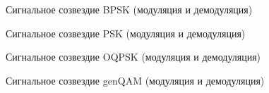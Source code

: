 \documentclass[12pt,a4paper]{report}
\begin{document}
Сигнальное созвездие BPSK (модуляция и демодуляция)

\begin{figure}[h!]
\end{figure}

Сигнальное созвездие PSK (модуляция и демодуляция)

\begin{figure}[h!]
\end{figure}

Сигнальное созвездие OQPSK (модуляция и демодуляция)

\begin{figure}[h!]
\end{figure}
\newpage
Сигнальное созвездие genQAM (модуляция и демодуляция)

\begin{figure}[h!]
\end{figure}
\end{document}
